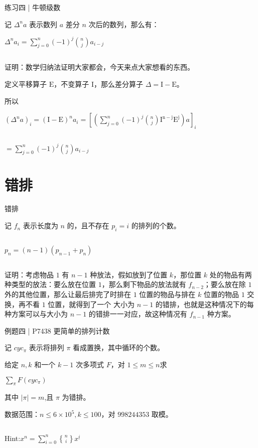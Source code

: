 \documentclass{beamer}
\begin{document}
\begin{frame}{练习四 | 牛顿级数}

    记 $\Delta^n a$ 表示数列 $a$ 差分 $n$ 次后的数列，那么有：

    $\Delta^n a_i = \sum_{j = 0} ^ n{(-1)^j\binom nj a_{i-j}}$

    $ $
    \pause

    证明：数学归纳法证明大家都会，今天来点大家想看的东西。

    定义平移算子 $\mathrm{E}$，不变算子 $\mathrm I$，那么差分算子 $\Delta = \mathrm{I - E}$。
    
    所以
    
    $(\Delta^n a)_i = (\mathrm{I-E})^na_i=[(\sum\limits_{j=0}^n{(-1)^j\binom nj\mathrm{I^{n-j}E^j}})a]_i$
    
    $ $
    
    $=\sum\limits_{j=0}^n{(-1)^j\binom nja_{i-j}}$
\end{frame}

\section{错排}

\begin{frame}{错排}

    记 $f_n$ 表示长度为 $n$ 的，且不存在 $p_i=i$ 的排列的个数。

    $ $
    \pause

    $p_n = (n-1)(p_{n-1}+p_n)$

    $ $
    \pause

    证明：考虑物品 $1$ 有 $n-1$ 种放法，假如放到了位置 $k$，那位置 $k$ 处的物品有两种类型的放法：要么放在位置 $1$，那么剩下物品的放法就有 $f_{n-2}$；要么放在除 $1$ 外的其他位置，那么让最后排完了时排在 $1$ 位置的物品与排在 $k$ 位置的物品 $1$ 交换，再不看 $1$ 位置，就得到了一个 大小为 $n-1$ 的错排，也就是这种情况下的每种方案可以与大小为 $n-1$ 的错排一一对应，故这种情况有 $f_{n-1}$ 种方案。
    
\end{frame}

\begin{frame}{例题四 | P7438 更简单的排列计数}
    
    记 $cyc_{\pi}$ 表示将排列 $\pi$ 看成置换，其中循环的个数。

    给定 $n,k$ 和一个 $k-1$ 次多项式 $F$，对 $1\leq m\leq n$求
    
    $\sum\limits_{\pi} F(cyc_{\pi})$

    其中 $|\pi| = m$,且 $\pi$ 为错排。

    数据范围：$n\leq6\times10^5,k\leq100$，对 $998244353$ 取模。

    $ $
    \pause

    Hint:$x^n=\sum\limits_{i = 0}^n{{n\brace i}x^{\underline i}}$
    
\end{frame}
\end{document}
